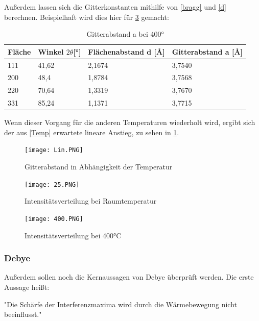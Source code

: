\documentclass[
	a4paper,
	12pt,
	pagesize,
	ngerman
]{scrartcl}
\begin{document}
Außerdem lassen sich die Gitterkonstanten mithilfe von \cref{bragg} und \cref{d} berechnen. Beispielhaft wird dies hier für \cref{400} gemacht:
\begin{table}[h]
\caption{Gitterabstand a bei 400°}
\begin{tabular}{|l|l|l|l|}
\hline
Fläche & Winkel $2 \theta${[}°{]} & Flächenabstand d {[}\AA{]} & Gitterabstand a {[}\AA{]} \\ \hline
111    & 41,62                     & 2,1674        & 3,7540      \\ \hline
200    & 48,4                      & 1,8784        & 3,7568       \\ \hline
220    & 70,64                     & 1,3319        & 3,7670       \\ \hline
331    & 85,24                     & 1,1371         & 3,7715       \\ \hline
\end{tabular}
\end{table} 

Wenn dieser Vorgang für die anderen Temperaturen wiederholt wird, ergibt sich der aus \cref{Temp} erwartete lineare Anstieg, zu sehen in \cref{Lin}.
\begin{figure}[h]
	\centering
	\texttt{[image: Lin.PNG]}
	\caption{Gitterabstand in Abhängigkeit der Temperatur}
	\label{Lin}
\end{figure}

\begin{figure}[h]
	\centering
	\texttt{[image: 25.PNG]}
	\caption{Intensitätsverteilung bei Raumtemperatur}
	\label{25}
\end{figure}


\begin{figure}[h]
	\centering
	\texttt{[image: 400.PNG]}
	\caption{Intensitätsverteilung bei 400°C}
	\label{400}
\end{figure}

\subsubsection{Debye}

Außerdem sollen noch die Kernaussagen von Debye überprüft werden. Die erste Aussage heißt:

"Die Schärfe der Interferenzmaxima wird durch die Wärmebewegung nicht beeinflusst."
\end{document}
